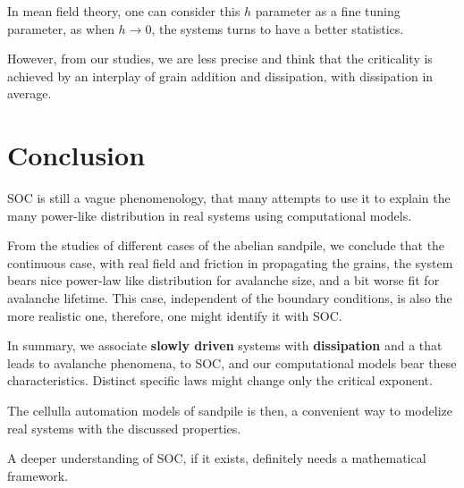 In mean field theory, one can consider this $h$ parameter as a fine tuning parameter, as when $h\longrightarrow0$, the systems turns to have a better statistics.

However, from our studies, we are less precise and think that the criticality is achieved by an interplay of grain addition and dissipation, with dissipation in average. 

 
\section{Conclusion}

SOC is still a vague phenomenology, that many attempts to use it to explain the many power-like distribution in real systems using computational models.

From the studies of different cases of the abelian sandpile, we conclude that the continuous case, with real field and friction in propagating the grains, 
the system bears nice power-law like distribution for avalanche size, and a bit worse fit for avalanche lifetime. 
This case, independent of the boundary conditions, is also the more realistic one, therefore, one might identify it with SOC. 

In summary, we associate \textbf{slowly driven} systems with \textbf{dissipation} and a  that leads to avalanche phenomena, to SOC, 
and our computational models bear these characteristics. 
Distinct specific laws might change only the critical exponent. 

The cellulla automation models of sandpile is then, a convenient way to modelize real systems with the discussed properties.

A deeper understanding of SOC, if it exists, definitely needs a mathematical framework. 